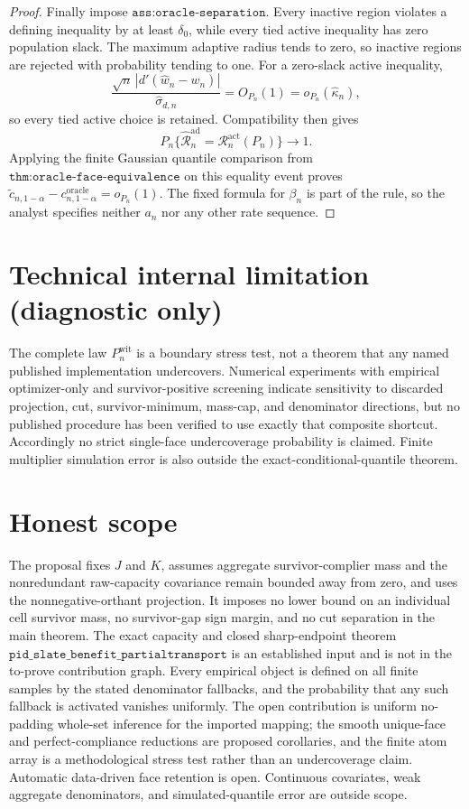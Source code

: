 \documentclass{article}
\begin{document}
\begin{proof}
Finally impose \(\texttt{ass:oracle-separation}\). Every inactive region violates a defining inequality by at least \(\delta_0\), while every tied active inequality has zero population slack. The maximum adaptive radius tends to zero, so inactive regions are rejected with probability tending to one. For a zero-slack active inequality,
\[
 \frac{\sqrt n\,|d'(\widehat w_n-w_n)|}{\widehat\sigma_{d,n}}=O_{P_n}(1)
 =o_{P_n}(\widehat\kappa_n),
\]
so every tied active choice is retained. Compatibility then gives
\[
 P_n\{\widehat{\mathcal R}_n^{\mathrm{ad}}
       =\mathcal R_n^{\mathrm{act}}(P_n)\}\longrightarrow1.
\]
Applying the finite Gaussian quantile comparison from \(\texttt{thm:oracle-face-equivalence}\) on this equality event proves
\(\widetilde c_{n,1-\alpha}-c^{\mathrm{oracle}}_{n,1-\alpha}=o_{P_n}(1)\). The fixed formula for \(\beta_n\) is part of the rule, so the analyst specifies neither \(a_n\) nor any other rate sequence.
\end{proof}

\section*{Technical internal limitation (diagnostic only)}

The complete law \(P_n^{\mathrm{wit}}\) is a boundary stress test, not a theorem that any named published implementation undercovers. Numerical experiments with empirical optimizer-only and survivor-positive screening indicate sensitivity to discarded projection, cut, survivor-minimum, mass-cap, and denominator directions, but no published procedure has been verified to use exactly that composite shortcut. Accordingly no strict single-face undercoverage probability is claimed. Finite multiplier simulation error is also outside the exact-conditional-quantile theorem.

\section{Honest scope}

The proposal fixes \(J\) and \(K\), assumes aggregate survivor-complier mass and the nonredundant raw-capacity covariance remain bounded away from zero, and uses the nonnegative-orthant projection. It imposes no lower bound on an individual cell survivor mass, no survivor-gap sign margin, and no cut separation in the main theorem. The exact capacity and closed sharp-endpoint theorem \(\texttt{pid\_slate\_benefit\_partialtransport}\) is an established input and is not in the to-prove contribution graph. Every empirical object is defined on all finite samples by the stated denominator fallbacks, and the probability that any such fallback is activated vanishes uniformly. The open contribution is uniform no-padding whole-set inference for the imported mapping; the smooth unique-face and perfect-compliance reductions are proposed corollaries, and the finite atom array is a methodological stress test rather than an undercoverage claim. Automatic data-driven face retention is open. Continuous covariates, weak aggregate denominators, and simulated-quantile error are outside scope.
\end{document}

